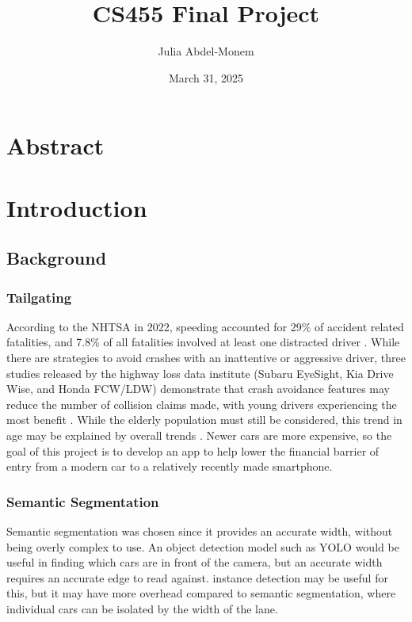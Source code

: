 \documentclass[12pt]{article}
\title{CS455 Final Project}
\author{Julia Abdel-Monem}
\date{March 31, 2025}
\begin{document}
    \maketitle

    \section*{Abstract}


    \section{Introduction}

    \subsection*{Background}

    \subsubsection*{Tailgating}

    According to the NHTSA in 2022, speeding accounted for 29\% of accident related fatalities, and 7.8\% of all fatalities involved at least one distracted driver \cite{NHTSA:Overview-2022}. While there are strategies to avoid crashes with an inattentive or aggressive driver, three studies released by the highway loss data institute (Subaru EyeSight, Kia Drive Wise, and Honda FCW/LDW) demonstrate that crash avoidance features may reduce the number of collision claims made, with young drivers experiencing the most benefit \cite{HLDI:SubaruEyeSight, HLDI:KiaDriveWise, HLDI:HondaFCW}. While the elderly population must still be considered, this trend in age may be explained by overall trends \cite{NHTSA:Overview-2022}. Newer cars are more expensive, so the goal of this project is to develop an app to help lower the financial barrier of entry from a modern car to a relatively recently made smartphone.

    \subsubsection*{Semantic Segmentation}

    Semantic segmentation was chosen since it provides an accurate width, without being overly complex to use. An object detection model such as YOLO would be useful in finding which cars are in front of the camera, but an accurate width requires an accurate edge to read against. instance detection may be useful for this, but it may have more overhead compared to semantic segmentation, where individual cars can be isolated by the width of the lane.
\end{document}
